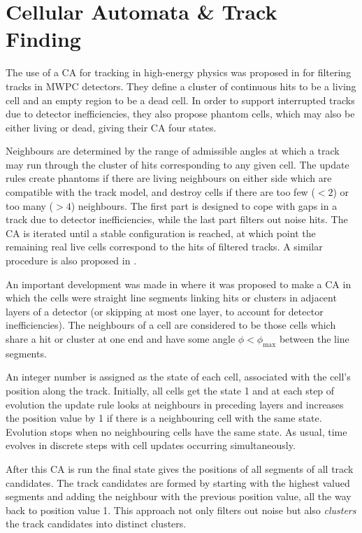 \section{Cellular Automata \& Track Finding}\label{sec:cellularautomaton_history}
The use of a \ac{CA} for tracking in high-energy physics was proposed in \citep{Glazov1992} for filtering tracks in \ac{MWPC} detectors. They define a cluster of continuous hits to be a living cell and an empty region to be a dead cell. In order to support interrupted tracks due to detector inefficiencies, they also propose phantom cells, which may also be either living or dead, giving their \ac{CA} four states.

Neighbours are determined by the range of admissible angles at which a track may run through the cluster of hits corresponding to any given cell. The update rules create phantoms if there are living neighbours on either side which are compatible with the track model, and destroy cells if there are too few ($< 2$) or too many ($> 4$) neighbours. The first part is designed to cope with gaps in a track due to detector inefficiencies, while the last part filters out noise hits. The \ac{CA} is iterated until a stable configuration is reached, at which point the remaining real live cells correspond to the hits of filtered tracks. A similar procedure is also proposed in \citep{Casolino1995}.

An important development was made in \citep{Kisel1997} where it was proposed to make a \ac{CA} in which the cells were straight line segments linking hits or clusters in adjacent layers of a detector (or skipping at most one layer, to account for detector inefficiencies). The neighbours of a cell are considered to be those cells which share a hit or cluster at one end and have some angle $\phi < \phi_\mathrm{max}$ between the line segments.

An integer number is assigned as the state of each cell, associated with the cell's position along the track. Initially, all cells get the state 1 and at each step of evolution the update rule looks at neighbours in preceding layers and increases the position value by 1 if there is a neighbouring cell with the same state. Evolution stops when no neighbouring cells have the same state. As usual, time evolves in discrete steps with cell updates occurring simultaneously.

After this \ac{CA} is run the final state gives the positions of all segments of all track candidates. The track candidates are formed by starting with the highest valued segments and adding the neighbour with the previous position value, all the way back to position value 1. This approach not only filters out noise but also \emph{clusters} the track candidates into distinct clusters.

